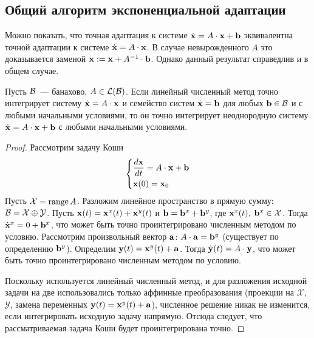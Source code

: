\subsection{Общий алгоритм экспоненциальной адаптации}
\label{subsection:exponential_fitting:general_exponential_fitting}

Можно показать, что точная адаптация к системе $ \dot{\mathbf{x}} = A \cdot \mathbf{x} + \mathbf{b} $
эквивалентна точной адаптации к системе $ \dot{\mathbf{x}} = A \cdot \mathbf{x} $.
В случае невырожденного $ A $ это доказывается заменой $ \mathbf{x} := \mathbf{x} + A^{-1} \cdot \mathbf{b} $.
Однако данный результат справедлив и в общем случае.

\begin{theorem}
    \label{theorem:general_exponential_fitting:exponential_fitting_equivalency}
    Пусть $ \mathcal{B} $~--- банахово, $ A \in \mathcal{L}(\mathcal{B}) $.
    Если линейный численный метод точно интегрирует систему $ \dot{\mathbf{x}} = A \cdot \mathbf{x} $
    и семейство систем $ \dot{\mathbf{x}} = \mathbf{b} $ для любых $ \mathbf{b} \in \mathcal{B} $ и с любыми начальными условиями,
    то он точно интегрирует неоднородную систему $ \dot{\mathbf{x}} = A \cdot \mathbf{x} + \mathbf{b} $
    с любыми начальными условиями.
\end{theorem}

\begin{proof}
    Рассмотрим задачу Коши
    \[
        \begin{dcases}
            \frac{d \mathbf{x}}{d t} = A \cdot \mathbf{x} + \mathbf{b} \\
            \mathbf{x}(0) = \mathbf{x}_0
        \end{dcases}
    \]
    Пусть $ \mathcal{X} = \operatorname*{\textnormal{range}} A $.
    Разложим линейное пространство в прямую сумму: $ \mathcal{B} = \mathcal{X} \oplus \mathcal{Y} $.
    Пусть $ \mathbf{x}(t) = \mathbf{x}^x(t) + \mathbf{x}^y(t) $ и $ \mathbf{b} = \mathbf{b}^x + \mathbf{b}^y $,
    где $ \mathbf{x}^x(t), \; \mathbf{b}^x \in \mathcal{X} $.
    Тогда $ \dot{\mathbf{x}}^x = 0 + \mathbf{b}^x $,
    что может быть точно проинтегрировано численным методом по условию.
    Рассмотрим произвольный вектор $ \mathbf{a} $: $ A \cdot \mathbf{a} = \mathbf{b}^y $
    (существует по определению $ \mathbf{b}^y $).
    Определим $ \mathbf{y}(t) = \mathbf{x}^y(t) + \mathbf{a} $.
    Тогда $ \dot{\mathbf{y}}(t) = A \cdot \mathbf{y} $,
    что может быть точно проинтегрировано численным методом по условию.

    Поскольку используется линейный численный метод,
    и для разложения исходной задачи на две использовались только аффинные преобразования
    (проекции на $ \mathcal{X} $, $ \mathcal{Y} $, замена переменных $ \mathbf{y}(t) = \mathbf{x}^y(t) + \mathbf{a} $),
    численное решение никак не изменится,
    если интегрировать исходную задачу напрямую.
    Отсюда следует, что рассматриваемая задача Коши будет проинтегрирована точно.
\end{proof}

